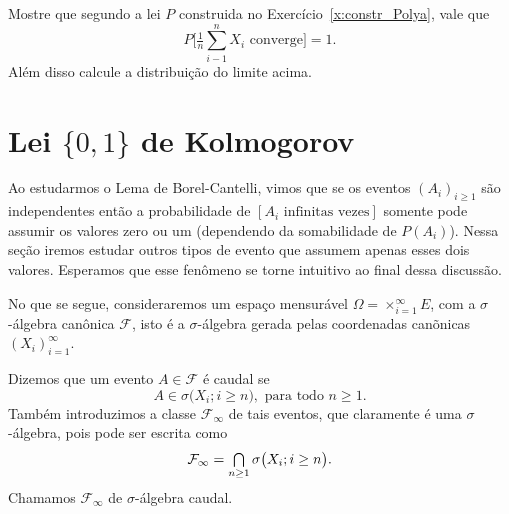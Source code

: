 \begin{exercise}
  Mostre que segundo a lei $P$ construida no Exercício~\ref{x:constr_Polya}, vale que
  \begin{equation}
    P\big[ \tfrac 1n \sum_{i-1}^n X_i \text{ converge}] = 1.
  \end{equation}
  Além disso calcule a distribuição do limite acima.
\end{exercise}




\section{Lei \texorpdfstring{$\{0, 1\}$}{\{0,1\}} de Kolmogorov}

Ao estudarmos o Lema de Borel-Cantelli, vimos que se os eventos $(A_i)_{i \geq 1}$ são independentes então a probabilidade de $[A_i \text{ infinitas vezes}]$ somente pode assumir os valores zero ou um (dependendo da somabilidade de $P(A_i)$).
Nessa seção iremos estudar outros tipos de evento que assumem apenas esses dois valores.
Esperamos que esse fenômeno se torne intuitivo ao final dessa discussão.

No que se segue, consideraremos um espaço mensurável $\Omega = \times_{i=1}^\infty E$, com a $\sigma$-álgebra canônica $\mathcal{F}$, isto é a $\sigma$-álgebra gerada pelas coordenadas canõnicas $(X_i)_{i=1}^\infty$.
\begin{definition}
  Dizemos que um evento $A \in \mathcal{F}$ é caudal se
  \begin{equation}
    A \in \sigma\big( X_i; i \geq n\big), \text{ para todo $n \geq 1$}.
  \end{equation}
  Também introduzimos a classe $\mathcal{F}_\infty$ de tais eventos, que claramente é uma $\sigma$-álgebra, pois pode ser escrita como
  \begin{equation}
    \mathcal{F}_\infty = \operatorname*{{\textstyle \bigcap}}_{n \geq 1} \sigma\big( X_i; i \geq n\big).
  \end{equation}
  Chamamos $\mathcal{F}_\infty$ de $\sigma$-álgebra caudal. 
\end{definition}

